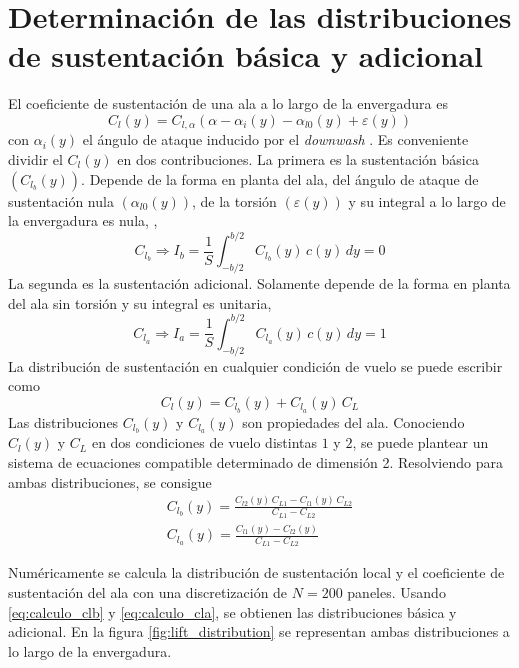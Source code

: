 
\section{Determinación de las distribuciones de sustentación básica y adicional} \label{sec:distribucion_lift}

El coeficiente de sustentación de una ala a lo largo de la envergadura es
\begin{equation} \label{eq:cl_general}
    C_l (y) = C_{l,\alpha} \left(\alpha - \alpha_i (y) - \alpha_{l0}(y) + \varepsilon(y) \right)
\end{equation}
con $\alpha_i(y)$ el ángulo de ataque inducido por el \emph{downwash} \cite{mccormick_1}. Es conveniente dividir el $C_l(y)$ en dos contribuciones. La primera es la sustentación básica $\left( C_{l_b}(y) \right)$. Depende de la forma en planta del ala, del ángulo de ataque de sustentación nula $\left( \alpha_{l0}(y) \right)$, de la torsión $\left( \varepsilon(y) \right)$ y su integral a lo largo de la envergadura es nula, \ie, 
\begin{equation} \label{eq:cl_basico}
     C_{l_b} \Rightarrow 
     I_b = \frac{1}{S} \int_{-b/2}^{b/2} C_{l_b}(y) \, c(y) \, d y = 0
\end{equation}
La segunda es la sustentación adicional. Solamente depende de la forma en planta del ala sin torsión y su integral es unitaria, 
\begin{equation} \label{eq:cl_adicional}
     C_{l_a} \Rightarrow 
    I_a = \frac{1}{S} \int_{-b/2}^{b/2} C_{l_a}(y) \, c(y) \, d y = 1 
\end{equation}
La distribución de sustentación en cualquier condición de vuelo se puede escribir como
\begin{equation} \label{eq:cl_seccion_distribuciones}
    C_l(y) = C_{l_b}(y) + C_{l_a}(y) \, C_L
\end{equation}
Las distribuciones $C_{l_b}(y)$ y $C_{l_a}(y)$ son propiedades del ala. Conociendo $C_l(y)$ y $C_L$ en dos condiciones de vuelo distintas $1$ y $2$, se puede plantear un sistema de ecuaciones compatible determinado de dimensión 2. Resolviendo para ambas distribuciones, se consigue
\begin{gather}
    C_{l_b}(y) = \frac{C_{l2}(y) \, C_{L1} - C_{l1}(y) \, C_{L2}}{C_{L1} - C_{L2}} \label{eq:calculo_clb} \\
    C_{l_a}(y) = \frac{C_{l1}(y) - C_{l2}(y)}{C_{L1} - C_{L2}} \label{eq:calculo_cla} 
\end{gather}

Numéricamente se calcula la distribución de sustentación local y el coeficiente de sustentación del ala con una discretización de $N = 200$ paneles. Usando \eqref{eq:calculo_clb} y \eqref{eq:calculo_cla}, se obtienen las distribuciones básica y adicional. En la figura \ref{fig:lift_distribution} se representan ambas distribuciones a lo largo de la envergadura.

